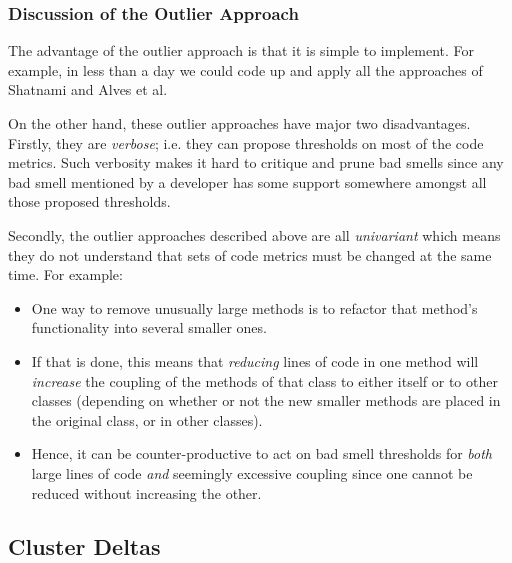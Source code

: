 \documentclass{sig-alternate}
\begin{document}
\subsubsection{Discussion of the Outlier Approach}
The advantage of the outlier
approach is that it is simple to implement. 
For example, in less than a day we could
code up and apply all the approaches of Shatnami and 
Alves et al.

On the other hand, these outlier approaches have major two disadvantages. 
Firstly, they are {\em verbose}; i.e.  they can
propose thresholds on most of the code metrics.
Such verbosity makes it hard   to critique and prune bad smells
since any bad smell mentioned by a developer has some support
somewhere amongst all those proposed thresholds.

Secondly, the outlier approaches described above are all 
{\em univariant} which means
they do  not understand
that sets of code metrics must
be changed at the same time.
For example:
\begin{itemize} 
\item One way to remove unusually large methods is to refactor that method's
functionality into several smaller ones. 
\item If that is done,
this means that {\em reducing} lines of code in one method
will {\em increase} the coupling of the methods of that class to
either itself or to other classes (depending on whether or not
the new smaller methods are placed in the original class, or in other classes).
\item
Hence, it can be counter-productive to act on bad smell thresholds for {\em both}
large lines of code {\em and} seemingly excessive coupling since
one cannot be reduced without increasing the other.
\end{itemize}



\subsection{Cluster Deltas}
\end{document}
